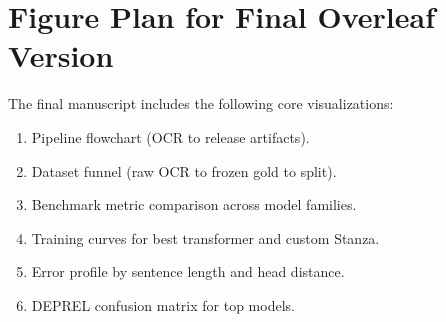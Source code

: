 \section{Figure Plan for Final Overleaf Version}



The final manuscript includes the following core visualizations:

\begin{enumerate}[leftmargin=1.25em]

  \item Pipeline flowchart (OCR to release artifacts).

  \item Dataset funnel (raw OCR to frozen gold to split).

  \item Benchmark metric comparison across model families.

  \item Training curves for best transformer and custom Stanza.

  \item Error profile by sentence length and head distance.

  \item DEPREL confusion matrix for top models.

\end{enumerate}

